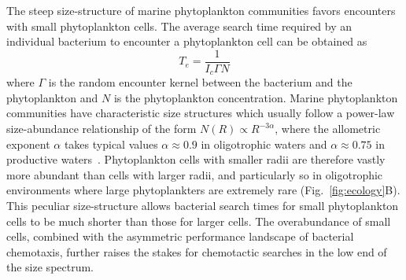 \documentclass[9pt,twocolumn,twoside]{pnas-new}
\begin{document}
The steep size-structure of marine phytoplankton communities favors encounters with small phytoplankton cells.
The average search time required by an individual bacterium to encounter a phytoplankton cell can be obtained as
\begin{equation}\label{eq:search_time}
    T_e = \dfrac{1}{I_c \Gamma N}
\end{equation}
where $\Gamma$ is the random encounter kernel between the bacterium and the phytoplankton and $N$ is the phytoplankton concentration.
Marine phytoplankton communities have characteristic size structures which usually follow a power-law size-abundance relationship of the form $N(R) \propto R^{-3\alpha}$, where the allometric exponent $\alpha$ takes typical values $\alpha\approx0.9$ in oligotrophic waters and $\alpha\approx0.75$ in productive waters~\cite{cermeno2008species}.
Phytoplankton cells with smaller radii are therefore vastly more abundant than cells with larger radii, and particularly so in oligotrophic environments where large phytoplankters are extremely rare (Fig.~\ref{fig:ecology}B).
This peculiar size-structure allows bacterial search times for small phytoplankton cells to be much shorter than those for larger cells.
%
The overabundance of small cells, combined with the asymmetric performance landscape of bacterial chemotaxis, further raises the stakes for chemotactic searches in the low end of the size spectrum.
\end{document}
